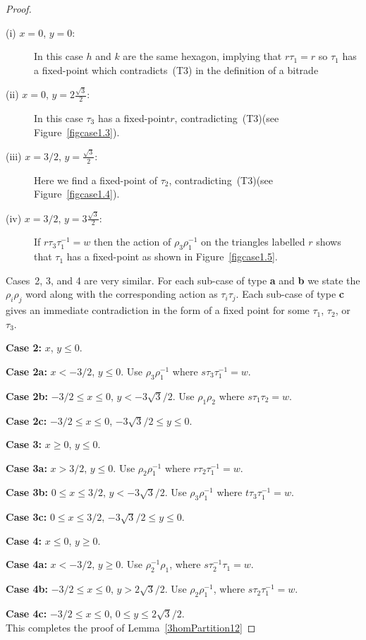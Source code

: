 \documentclass[amstags,fleqn,reqno]{article}
\theoremstyle{plain}
\theoremstyle{definition}
\renewcommand\geq{\geqslant}
\renewcommand\leq{\leqslant}
\newcommand{\fp}{fixed-point\xspace}
\newcommand{\Tfpf}{\textnormal{(T3)}\xspace}
\begin{document}
\begin{proof}
\begin{description}

\item[(i) $x=0$, $y=0$:] In this case $h$ and $k$ are the same hexagon, implying
that $r \tau_1 = r$ so $\tau_1$ has a \fp which
contradicts~\Tfpf in the definition of a bitrade

\item[(ii) $x=0$, $y=2 \frac{\sqrt{3}}{2}$:]
In this case $\tau_3$ has a \fp $r$, contradicting~\Tfpf (see
Figure~\ref{figcase1.3}).

\item[(iii) $x=3/2$, $y=\frac{\sqrt{3}}{2}$:]
Here we find a \fp of $\tau_2$, contradicting~\Tfpf (see
Figure~\ref{figcase1.4}).

\item[(iv) $x=3/2$, $y=3\frac{\sqrt{3}}{2}$:]
If $r \tau_3 \tau_1^{-1} = w$ then the action of 
$\rho_3 \rho_1^{-1}$ on the triangles labelled $r$ shows that $\tau_1$
has a \fp as shown in Figure~\ref{figcase1.5}.

\end{description}

Cases~2, 3, and 4 are very similar. For each sub-case of type
{\bf a} and {\bf b} we state the 
$\rho_i \rho_j$ word along with the corresponding action as
$\tau_i \tau_j$.  Each sub-case of type {\bf c} gives an immediate
contradiction in the form of a fixed point for
some $\tau_1$, $\tau_2$,  or $\tau_3$.

{\bf Case 2:} $x$, $y \leq 0$.

{\bf Case 2a:} $x < -3/2$, $y \leq 0$.
Use $\rho_3 \rho_1^{-1}$ where $s \tau_3 \tau_1^{-1} = w$.

{\bf Case 2b:} $-3/2 \leq x \leq 0$, $y < -3 {\sqrt{3}}/{2}$.
Use $\rho_1 \rho_2$ where $s \tau_1 \tau_2 = w$.

{\bf Case 2c:} $-3/2 \leq x \leq 0$, $-3 {\sqrt{3}}/{2} \leq y \leq 0$.

{\bf Case 3:} $x \geq 0$, $y \leq 0$.

{\bf Case 3a:} $x > 3/2$, $y \leq 0$.
Use $\rho_2 \rho_1^{-1}$ where $r \tau_2 \tau_1^{-1} = w$.

{\bf Case 3b:} $0 \leq x \leq 3/2$, $y < -3 {\sqrt{3}}/{2}$.
Use $\rho_3 \rho_1^{-1}$ where $t \tau_3 \tau_1^{-1} = w$.

{\bf Case 3c:} $0 \leq x \leq 3/2$, $-3 {\sqrt{3}}/{2} \leq y \leq 0$.

{\bf Case 4:} $x \leq 0$, $y \geq 0$.

{\bf Case 4a:} $x < -{3}/{2}$, $y \geq 0$.
Use $\rho_2^{-1} \rho_1$, where $s \tau_2^{-1} \tau_1 = w$.

{\bf Case 4b:} $-{3}/{2} \leq x \leq 0$, $y > 2 {\sqrt{3}}/{2}$.
Use $\rho_2 \rho_1^{-1}$, where $s \tau_2 \tau_1^{-1} = w$.

{\bf Case 4c:} $-{3}/{2} \leq x \leq 0$, $0 \leq y \leq 2
{\sqrt{3}}/{2}$. \\

This completes the proof of Lemma~\ref{3homPartition12} 
\end{proof}
\end{document}
